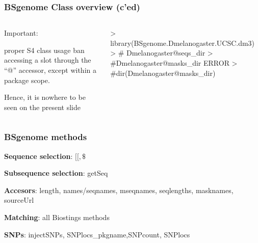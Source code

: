 \documentclass{beamer}
\begin{document}

\begin{frame}[fragile]
\frametitle{BSgenome Class overview (c'ed)}
  \begin{columns}
  \begin{column}[t]{0.45\textwidth}%
  \bit
      \item Important:
        \bit
            \item proper S4 class usage ban accessing a slot through the ``@'' accessor, except within a package scope.
            \item Hence, it is nowhere to be seen on the present slide
        \eit
  \eit
  \end{column}
    
  \begin{column}[t]{0.45\textwidth}%
        \begin{uncoverenv}
\begin{Schunk}
\begin{Sinput}
> library(BSgenome.Dmelanogaster.UCSC.dm3)
> # Dmelanogaster@seqs_dir
> #Dmelanogaster@masks_dir    ERROR
> #dir(Dmelanogaster@masks_dir)
\end{Sinput}
\end{Schunk}
        \end{uncoverenv}
  \end{column}
  \end{columns}
\end{frame}


\begin{frame}
\frametitle{BSgenome methods}
  \bit
      \item \textbf{Sequence selection}: $[[,\$ $
      \item \textbf{Subsequence selection}: getSeq
      \item \textbf{Accesors}: length, names/seqnames, mseqnames, seqlengths, masknames, sourceUrl
      \item \textbf{Matching}: all Biostings methods
      \item \textbf{SNPs}: injectSNPs, SNPlocs_pkgname,SNPcount, SNPlocs
  \eit
\end{frame}

\end{document}
